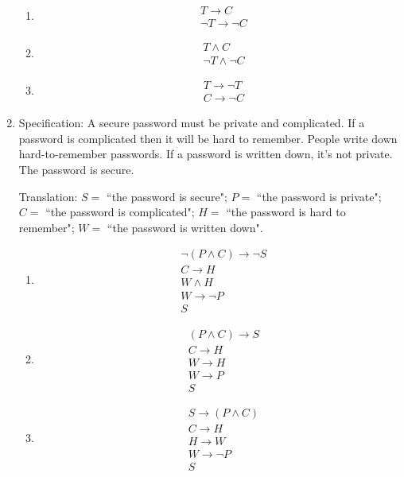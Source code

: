 \begin{enumerate}
    \begin{enumerate}
        \item \begin{align*} &T \to C \\&  \neg T \to \neg C \end{align*}
        \item \begin{align*} &T \wedge C \\  & \neg  T \wedge \neg C \end{align*}
        \item \begin{align*} &T \to \neg T  \\ & C  \to \neg  C \end{align*}
    \end{enumerate}
    
    \item Specification: A secure password must be private and complicated. If
    a password is  complicated then  it will be hard to  remember.  People
    write down hard-to-remember passwords. If a password is written down, it's  not private.   The password is secure.

    Translation: $S =$ ``the password is secure"; $P = $ ``the password is private"; 
    $C = $  ``the password is  complicated"; $H = $ ``the password is hard to remember";
    $W =  $ ``the password is written down".
    
    \begin{enumerate}
        \item \begin{align*} &\neg (P \wedge C) \to \neg  S  \\ & C \to H  \\ & W \wedge H \\ & W \to  \neg P \\ & S \end{align*}
        \item \begin{align*} &(P \wedge  C)  \to S  \\ &  C \to H\\ & W  \to  H \\  & W \to P \\ & S\end{align*}
        \item \begin{align*} & S  \to (P \wedge C)  \\ &  C \to H\\ & H  \to  W \\  & W \to \neg P \\ & S\end{align*}
\end{enumerate}

\end{enumerate}